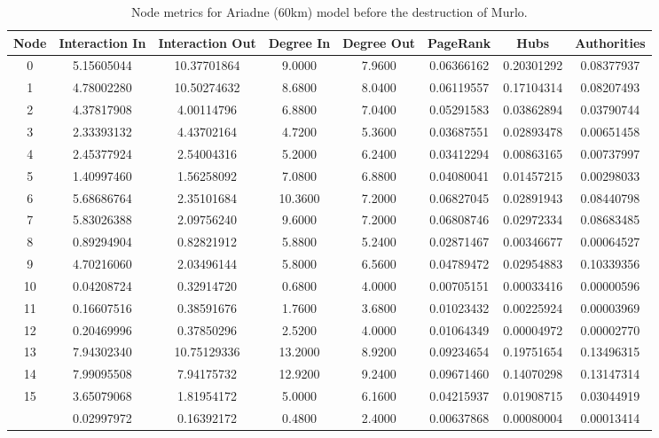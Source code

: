 \documentclass[12pt,a4paper]{thesis}
\begin{document}
\begin{table}[H]
\centering
\caption{Node metrics for Ariadne (60km) model before the destruction of Murlo.}
\tiny
\begin{tabular}{|c|c|c|c|c|c|c|c|}
\hline	Node	&	Interaction In	&	Interaction Out	&	Degree In	&	Degree Out	&	PageRank	&	Hubs	&	Authorities	\\
\hline	0	&	5.15605044	&	10.37701864	&	9.0000	&	7.9600	&	0.06366162	&	0.20301292	&	0.08377937	\\
\hline	1	&	4.78002280	&	10.50274632	&	8.6800	&	8.0400	&	0.06119557	&	0.17104314	&	0.08207493	\\
\hline	2	&	4.37817908	&	4.00114796	&	6.8800	&	7.0400	&	0.05291583	&	0.03862894	&	0.03790744	\\
\hline	3	&	2.33393132	&	4.43702164	&	4.7200	&	5.3600	&	0.03687551	&	0.02893478	&	0.00651458	\\
\hline	4	&	2.45377924	&	2.54004316	&	5.2000	&	6.2400	&	0.03412294	&	0.00863165	&	0.00737997	\\
\hline	5	&	1.40997460	&	1.56258092	&	7.0800	&	6.8800	&	0.04080041	&	0.01457215	&	0.00298033	\\
\hline	6	&	5.68686764	&	2.35101684	&	10.3600	&	7.2000	&	0.06827045	&	0.02891943	&	0.08440798	\\
\hline	7	&	5.83026388	&	2.09756240	&	9.6000	&	7.2000	&	0.06808746	&	0.02972334	&	0.08683485	\\
\hline	8	&	0.89294904	&	0.82821912	&	5.8800	&	5.2400	&	0.02871467	&	0.00346677	&	0.00064527	\\
\hline	9	&	4.70216060	&	2.03496144	&	5.8000	&	6.5600	&	0.04789472	&	0.02954883	&	0.10339356	\\
\hline	10	&	0.04208724	&	0.32914720	&	0.6800	&	4.0000	&	0.00705151	&	0.00033416	&	0.00000596	\\
\hline	11	&	0.16607516	&	0.38591676	&	1.7600	&	3.6800	&	0.01023432	&	0.00225924	&	0.00003969	\\
\hline	12	&	0.20469996	&	0.37850296	&	2.5200	&	4.0000	&	0.01064349	&	0.00004972	&	0.00002770	\\
\hline	13	&	7.94302340	&	10.75129336	&	13.2000	&	8.9200	&	0.09234654	&	0.19751654	&	0.13496315	\\
\hline	14	&	7.99095508	&	7.94175732	&	12.9200	&	9.2400	&	0.09671460	&	0.14070298	&	0.13147314	\\
\hline	15	&	3.65079068	&	1.81954172	&	5.0000	&	6.1600	&	0.04215937	&	0.01908715	&	0.03044919	\\
\rowcolor{yellow}
\hline	16	&	0.02997972	&	0.16392172	&	0.4800	&	2.4000	&	0.00637868	&	0.00080004	&	0.00013414	\\

\end{tabular}
\end{table}
\end{document}
